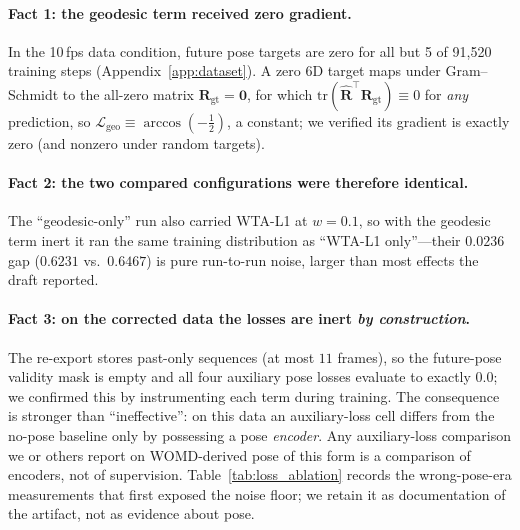 \documentclass{article} %
\begin{document}
\paragraph{Fact 1: the geodesic term received zero gradient.}
In the 10\,fps data condition, future pose targets are zero for all but 5 of
91{,}520 training steps (Appendix~\ref{app:dataset}). A zero 6D target maps under
Gram--Schmidt to the all-zero matrix $\mathbf{R}_{\text{gt}}{=}\mathbf{0}$, for
which $\text{tr}(\hat{\mathbf{R}}^\top \mathbf{R}_{\text{gt}}) \equiv 0$ for
\emph{any} prediction, so $\mathcal{L}_{\text{geo}} \equiv \arccos(-\tfrac12)$, a
constant; we verified its gradient is exactly zero (and nonzero under random targets).

\paragraph{Fact 2: the two compared configurations were therefore identical.}
The ``geodesic-only'' run also carried WTA-L1 at $w{=}0.1$, so with the geodesic
term inert it ran the same training distribution as ``WTA-L1 only''---their
$0.0236$ gap ($0.6231$ vs.\ $0.6467$) is pure run-to-run noise, larger than most
effects the draft reported.

\paragraph{Fact 3: on the corrected data the losses are inert \emph{by construction}.}
The re-export stores past-only sequences (at most $11$ frames), so the future-pose
validity mask is empty and all four auxiliary pose losses evaluate to exactly
$0.0$; we confirmed this by instrumenting each term during training. The
consequence is stronger than ``ineffective'': on this data an auxiliary-loss cell
differs from the no-pose baseline only by possessing a pose \emph{encoder}. Any
auxiliary-loss comparison we or others report on WOMD-derived pose of this form is
a comparison of encoders, not of supervision. Table~\ref{tab:loss_ablation}
records the wrong-pose-era measurements that first exposed the noise floor; we
retain it as documentation of the artifact, not as evidence about pose.
\end{document}
